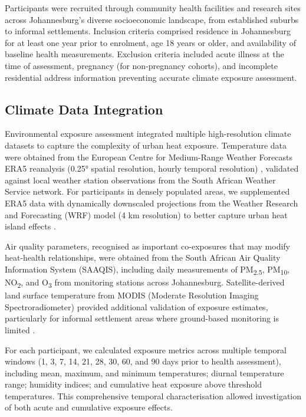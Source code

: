 \documentclass[11pt,a4paper]{article}
\begin{document}
Participants were recruited through community health facilities and research sites across Johannesburg's diverse socioeconomic landscape, from established suburbs to informal settlements. Inclusion criteria comprised residence in Johannesburg for at least one year prior to enrolment, age 18 years or older, and availability of baseline health measurements. Exclusion criteria included acute illness at the time of assessment, pregnancy (for non-pregnancy cohorts), and incomplete residential address information preventing accurate climate exposure assessment.

\subsection{Climate Data Integration}

Environmental exposure assessment integrated multiple high-resolution climate datasets to capture the complexity of urban heat exposure. Temperature data were obtained from the European Centre for Medium-Range Weather Forecasts ERA5 reanalysis (0.25° spatial resolution, hourly temporal resolution) \citep{Hersbach2020}, validated against local weather station observations from the South African Weather Service network. For participants in densely populated areas, we supplemented ERA5 data with dynamically downscaled projections from the Weather Research and Forecasting (WRF) model (4 km resolution) to better capture urban heat island effects \citep{Skamarock2019}.

Air quality parameters, recognised as important co-exposures that may modify heat-health relationships, were obtained from the South African Air Quality Information System (SAAQIS), including daily measurements of PM\textsubscript{2.5}, PM\textsubscript{10}, NO\textsubscript{2}, and O\textsubscript{3} from monitoring stations across Johannesburg. Satellite-derived land surface temperature from MODIS (Moderate Resolution Imaging Spectroradiometer) provided additional validation of exposure estimates, particularly for informal settlement areas where ground-based monitoring is limited \citep{Wan2021}.

For each participant, we calculated exposure metrics across multiple temporal windows (1, 3, 7, 14, 21, 28, 30, 60, and 90 days prior to health assessment), including mean, maximum, and minimum temperatures; diurnal temperature range; humidity indices; and cumulative heat exposure above threshold temperatures. This comprehensive temporal characterisation allowed investigation of both acute and cumulative exposure effects.
\end{document}
